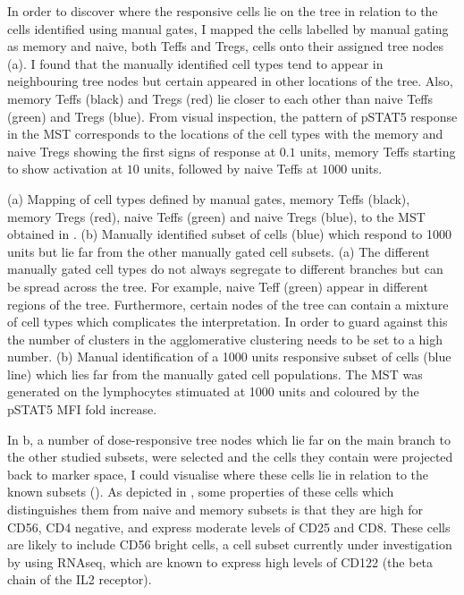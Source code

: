 In order to discover where the responsive cells lie on the tree in relation to the cells identified using manual gates, I mapped
the cells labelled by manual gating as memory and naive, both Teffs and Tregs, cells onto their assigned tree nodes (a).
I found that the manually identified cell types tend to appear in neighbouring tree nodes but certain appeared in other locations of the tree.
Also, memory Teffs (black) and Tregs (red) lie closer to each other than naive Teffs (green) and Tregs (blue).
From visual inspection, the pattern of pSTAT5 response in the \gls{MST} corresponds to the locations of the cell types
with the memory and naive Tregs showing the first signs of response at $0.1$ units, memory Teffs starting to show activation at $10$ units,
followed by naive Teffs at $1000$ units.

{ (a) Mapping of cell types defined by manual gates, memory Teffs (black), memory Tregs (red), naive Teffs (green) and naive Tregs (blue), to the \gls{MST} obtained
  in . (b) Manually identified subset of cells (blue) which respond to 1000 units but lie far from the other manually gated
  cell subsets.
}
{
  (a)
  The different manually gated cell types do not always segregate to different branches but can be spread across the tree.
  For example, naive Teff (green) appear in different regions of the tree.
  Furthermore, certain nodes of the tree can contain a mixture of cell types which complicates the interpretation.
  In order to guard against this the number of clusters in the agglomerative clustering needs to be set to a high number.
  (b)
  Manual identification of a 1000 units responsive subset of cells (blue line) which lies far from the manually gated cell populations.
  The \gls{MST} was generated on the lymphocytes stimuated at 1000 units and coloured by the pSTAT5 MFI fold increase.
}

In b, a number of dose-responsive tree nodes which lie far on the main branch to the other studied subsets,
were selected and the cells they contain were projected back to marker space, I could visualise where these cells lie in relation to the
known subsets ().
As depicted in , some properties of these cells which distinguishes them from 
naive and memory subsets is that they are high for CD56, CD4 negative, and express moderate levels of CD25 and CD8.
These cells are likely to include CD56 bright cells,
a cell subset currently under investigation by  using RNAseq,
which are known to express high levels of CD122 (the beta chain of the IL2 receptor).

